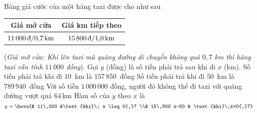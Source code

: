 \begin{ex}%
	Bảng giá cước của một hãng taxi được cho như sau
	\begin{center}
		\renewcommand\arraystretch{1.2}
		\begin{tabular}{|c|c|}
			\hline Giá mở cửa & Giá km tiếp theo \\
			\hline $11\,000 \text{\,đ}/ 0{,}7 \mathrm{\,km}$ & $15\,800 \text{\,đ}/ 1{,}0 \mathrm{\,km}$ \\
			\hline
		\end{tabular}
	\end{center}
	(\textit{Giá mở cửa: Khi lên taxi mà quãng đường di chuyển không quá $0{,}7$ km thì hãng taxi vẫn tính $11\,000$ đồng}). Gọi $y$ (đồng) là số tiền phải trả sau khi đi $x$ (km).
	\choiceTF
	{Số tiền phải trả khi đi $10$ \,km là $157\,850$ \,đồng}
	{\True Số tiền phải trả khi đi $50$ \,km là $789\,940$ \,đồng}
	{\True Với số tiền $1\,000\,000$ đồng, người đó không thể đi taxi với quãng đường vượt quá $64$\,km}
	{\True Hàm số của $y$ theo $x$ là $y=\heva{& 11\,000 &\text{khi}\; x \leq 0{,}7 \\& 15\,800 x-60 & \text{khi}\;x>0{,}7}$}
\end{ex}


